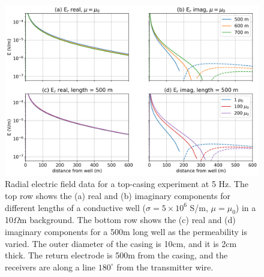 \begin{figure}
    \begin{center}
    \includegraphics[width=\textwidth]{figures/motivation-casing-integrity-500.png}
    \end{center}
\caption{
    Radial electric field data for a top-casing experiment at 5 Hz. The top row shows the (a) real and (b) imaginary components for different lengths of a conductive well ($\sigma=5\times10^6$ S/m, $\mu=\mu_0$) in a 10$\Omega$m background. The bottom row shows the (c) real and (d) imaginary components for a 500m long well as the permeability is varied. The outer diameter of the casing is 10cm, and it is 2cm thick. The return electrode is 500m from the casing, and the receivers are along a line $180^\circ$ from the transmitter wire.
}
\label{fig:motivation-casing-integrity}
\end{figure}




